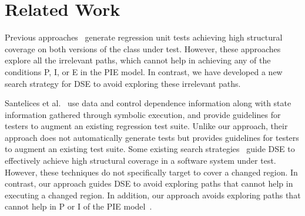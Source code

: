 
\section{Related Work}
\label{sec:related}
Previous approaches~\cite{evans:DiffTest07, taneja08:diffgen} generate regression unit tests achieving high structural coverage on both versions of the class under test. However, these approaches explore all the irrelevant paths, which cannot help in achieving any of the conditions P, I, or E in the PIE model. In contrast, we have developed a new search strategy for DSE to avoid exploring these irrelevant paths. 


Santelices et al.~\cite{Apiwattanapong2006AUG, santelices08sep} use data and control dependence information along with state information gathered through symbolic execution, and provide guidelines for testers to augment an existing regression test suite. Unlike our approach, their approach does not automatically generate tests but provides guidelines for testers to augment an existing test suite. 
Some existing search strategies~\cite{burnim, fitnex} guide DSE to effectively achieve high structural coverage in a software system under test. However,
these techniques do not specifically target to cover a changed region. In contrast, our approach guides DSE to avoid exploring paths that cannot help in executing a changed region. In addition, our approach avoids exploring paths that cannot help in P or I of the PIE model~\cite{voas}.

